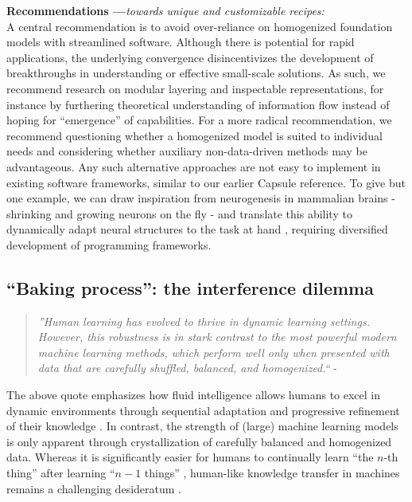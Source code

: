 \documentclass[manuscript,screen,authorversion,nonacm]{acmart}
\begin{document}
\noindent \textbf{Recommendations ---}\textit{towards unique and customizable recipes:}\\
A central recommendation is to avoid over-reliance on homogenized foundation models with streamlined software. Although there is potential for rapid applications, the underlying convergence disincentivizes the development of breakthroughs in understanding or effective small-scale solutions. As such, we recommend research on modular layering and inspectable representations, for instance by furthering theoretical understanding of information flow \cite{SchwartzZiv2017Information,Saxe2018InformationBottleneck} instead of hoping for ``emergence'' of capabilities. For a more radical recommendation, we recommend questioning whether a homogenized model is suited to individual needs and considering whether auxiliary non-data-driven methods may be advantageous. Any such alternative approaches are not easy to implement in existing software frameworks, similar to our earlier Capsule reference. To give but one example, we can draw inspiration from neurogenesis in mammalian brains \cite{Gross2000Neurogenesis,Vadodaria2014Neurogenesis} - shrinking and growing neurons on the fly - and translate this ability to dynamically adapt neural structures to the task at hand \cite{Ash1989DynamicNode, Evci2022GradMax, Mitchell2024SelfExpanding}, requiring diversified development of programming frameworks.


\subsection{``Baking process'': the interference dilemma}
\begin{quote}
    \emph{''Human learning has evolved to thrive in dynamic learning settings. However, this robustness is in stark contrast to the most powerful modern machine learning methods, which perform well only when presented with data that are carefully shuffled, balanced, and homogenized.``} - \citet{Hadsell2020EmbracingChange}
\end{quote}

\noindent The above quote emphasizes how fluid intelligence allows humans to excel in dynamic environments through sequential adaptation and progressive refinement of their knowledge \cite{Flesch2018continualmindmachine,Flesch2023ContinualContextGating}. In contrast, the strength of (large) machine learning models is only apparent through crystallization of carefully balanced and homogenized data. Whereas it is significantly easier for humans to continually learn ``the $n$-th thing'' after learning ``$n-1$ things'' \cite{Thrun1996LearningNth,Hadsell2020EmbracingChange}, human-like knowledge transfer in machines remains a challenging desideratum \cite{Pan2010Transfer, kudithipudi2022biolifelong}.
\end{document}
